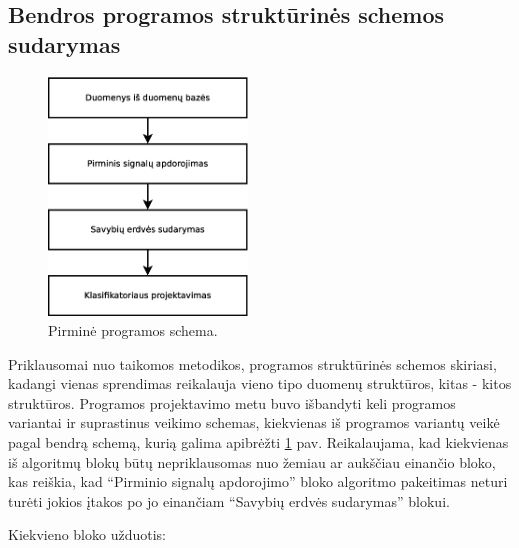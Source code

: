\documentclass[]{vgtuef}
\begin{document}
\subsection{Bendros programos struktūrinės schemos sudarymas}

\begin{figure}[!b]
  \centering
  \includegraphics[width=200px]{figures/pirmine_schema.eps}
  \caption{Pirminė programos schema.}
  \label{fig:pirmine_programos_schema}
\end{figure}

Priklausomai nuo taikomos metodikos, programos struktūrinės schemos skiriasi, kadangi vienas sprendimas reikalauja vieno tipo duomenų struktūros, kitas - kitos struktūros. Programos projektavimo metu buvo išbandyti keli programos variantai ir suprastinus veikimo schemas, kiekvienas iš programos variantų veikė pagal bendrą schemą, kurią galima apibrėžti \ref{fig:pirmine_programos_schema} pav. Reikalaujama, kad kiekvienas iš algoritmų blokų būtų nepriklausomas nuo žemiau ar aukščiau einančio bloko, kas reiškia, kad ``Pirminio signalų apdorojimo'' bloko algoritmo pakeitimas neturi turėti jokios įtakos po jo einančiam ``Savybių erdvės sudarymas'' blokui. 

Kiekvieno bloko užduotis:
\end{document}

